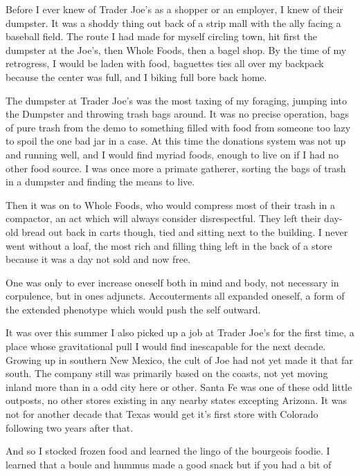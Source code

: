 \documentclass[ebook, 10pt, openright, onecolumn]{memoir}
\newcommand*\td[1]{
  \todo[inline]{
     #1 
  }
}
\newcommand*\finish{\td{ ----- Finish this section -----}}
\begin{document}
\finish

Before I ever knew of Trader Joe's as a shopper or an employer, I knew of their
dumpster.  It was a shoddy thing out back of a strip mall with the ally facing a
baseball field.  The route I had made for myself circling town, hit first the
dumpster at the Joe's, then Whole Foods, then a bagel shop.  By the time
of my retrogress, I would be laden with food, baguettes ties all over my
backpack because the center was full, and I biking full bore back home.

The dumpster at Trader Joe's was the most taxing of my foraging, jumping into
the Dumpster and throwing trash bags around.  It was no precise operation,
bags of pure trash from the demo to something filled with food from someone too
lazy to spoil the one bad jar in a case.  At this time the donations system was
not up and running well, and I would find myriad foods, enough to live on if I
had no other food source.  I was once more a primate gatherer, sorting the bags
of trash in a dumpster and finding the means to live.

Then it was on to Whole Foods, who would compress most of their trash in a
compactor, an act which will always consider disrespectful.  They left their
day-old bread out back in carts though, tied and sitting next to the building.
I never went without a loaf, the most rich and filling thing left in the back of
a store because it was a day not sold and now free.  

One was only to ever increase oneself both in mind and body, not
necessary in corpulence, but in ones adjuncts.  Accouterments all expanded
oneself, a form of the extended phenotype which would push the self outward.


It was over this summer I also picked up a job at Trader Joe's for the first
time, a place whose gravitational pull I would find inescapable for the next
decade.  Growing up in southern New Mexico, the cult of Joe had not yet made it
that far south.  The company still was primarily based on the coasts, not yet
moving inland more than in a odd city here or other. Santa Fe was one of these
odd little outposts, no other stores existing in any nearby states excepting
Arizona.  It was not for another decade that Texas  would get it's first
store with Colorado following two years after that.

\finish

And so I stocked frozen food and learned the lingo of the bourgeois foodie. I
learned that a boule and hummus made a good snack but if you had a bit of
\end{document}
